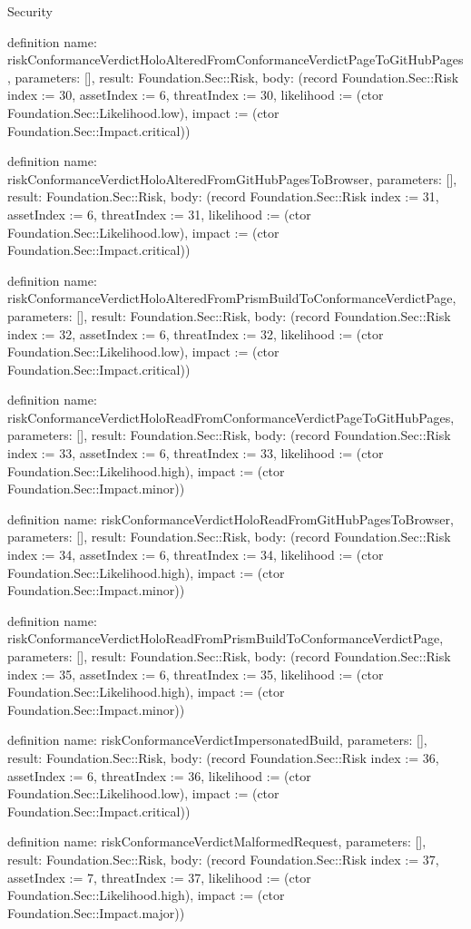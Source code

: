 \begin{lexlean}{Security}
\begin{semanticmodule}
definition{
  name: riskConformanceVerdictHoloAlteredFromConformanceVerdictPageToGitHubPages,
  parameters: [],
  result: Foundation.Sec::Risk,
  body: (record Foundation.Sec::Risk {index := 30, assetIndex := 6, threatIndex := 30, likelihood := (ctor Foundation.Sec::Likelihood.low), impact := (ctor Foundation.Sec::Impact.critical)})
}

definition{
  name: riskConformanceVerdictHoloAlteredFromGitHubPagesToBrowser,
  parameters: [],
  result: Foundation.Sec::Risk,
  body: (record Foundation.Sec::Risk {index := 31, assetIndex := 6, threatIndex := 31, likelihood := (ctor Foundation.Sec::Likelihood.low), impact := (ctor Foundation.Sec::Impact.critical)})
}

definition{
  name: riskConformanceVerdictHoloAlteredFromPrismBuildToConformanceVerdictPage,
  parameters: [],
  result: Foundation.Sec::Risk,
  body: (record Foundation.Sec::Risk {index := 32, assetIndex := 6, threatIndex := 32, likelihood := (ctor Foundation.Sec::Likelihood.low), impact := (ctor Foundation.Sec::Impact.critical)})
}

definition{
  name: riskConformanceVerdictHoloReadFromConformanceVerdictPageToGitHubPages,
  parameters: [],
  result: Foundation.Sec::Risk,
  body: (record Foundation.Sec::Risk {index := 33, assetIndex := 6, threatIndex := 33, likelihood := (ctor Foundation.Sec::Likelihood.high), impact := (ctor Foundation.Sec::Impact.minor)})
}

definition{
  name: riskConformanceVerdictHoloReadFromGitHubPagesToBrowser,
  parameters: [],
  result: Foundation.Sec::Risk,
  body: (record Foundation.Sec::Risk {index := 34, assetIndex := 6, threatIndex := 34, likelihood := (ctor Foundation.Sec::Likelihood.high), impact := (ctor Foundation.Sec::Impact.minor)})
}

definition{
  name: riskConformanceVerdictHoloReadFromPrismBuildToConformanceVerdictPage,
  parameters: [],
  result: Foundation.Sec::Risk,
  body: (record Foundation.Sec::Risk {index := 35, assetIndex := 6, threatIndex := 35, likelihood := (ctor Foundation.Sec::Likelihood.high), impact := (ctor Foundation.Sec::Impact.minor)})
}

definition{
  name: riskConformanceVerdictImpersonatedBuild,
  parameters: [],
  result: Foundation.Sec::Risk,
  body: (record Foundation.Sec::Risk {index := 36, assetIndex := 6, threatIndex := 36, likelihood := (ctor Foundation.Sec::Likelihood.low), impact := (ctor Foundation.Sec::Impact.critical)})
}

definition{
  name: riskConformanceVerdictMalformedRequest,
  parameters: [],
  result: Foundation.Sec::Risk,
  body: (record Foundation.Sec::Risk {index := 37, assetIndex := 7, threatIndex := 37, likelihood := (ctor Foundation.Sec::Likelihood.high), impact := (ctor Foundation.Sec::Impact.major)})
}


\end{semanticmodule}
\end{lexlean}
